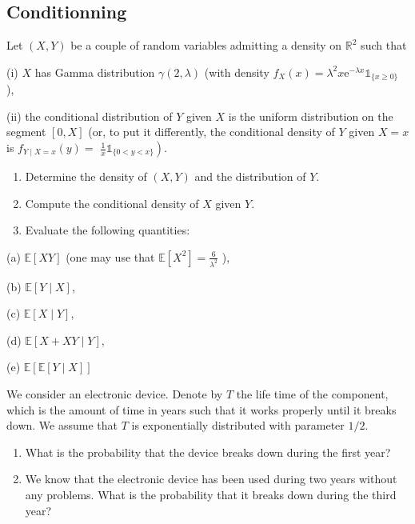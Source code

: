 \begin{center}
  \section*{Conditionning}
\end{center}

\begin{Exercise}
  Let $(X, Y)$ be a couple of random variables admitting a density on $\mathbb{R}^{2}$ such that

  (i) $X$ has Gamma distribution $\gamma(2, \lambda)$ (with density $f_{X}(x)=\lambda^{2} x \mathrm{e}^{-\lambda x} \mathbb{1}_{\{x \geq 0\}}$ ),

  (ii) the conditional distribution of $Y$ given $X$ is the uniform distribution on the segment $[0, X]$ (or, to put it differently, the conditional density of $Y$ given $X=x$ is $f_{Y \mid X=x}(y)=$ $\left.\frac{1}{x} \mathbb{1}_{\{0<y<x\}}\right)$.

  \begin{enumerate}
    \item Determine the density of $(X, Y)$ and the distribution of $Y$.

    \item Compute the conditional density of $X$ given $Y$.

    \item Evaluate the following quantities:

  \end{enumerate}

  (a) $\mathbb{E}[X Y]$ (one may use that $\mathbb{E}\left[X^{2}\right]=\frac{6}{\lambda^{2}}$ ),

  (b) $\mathbb{E}[Y \mid X]$,

  (c) $\mathbb{E}[X \mid Y]$,

  (d) $\mathbb{E}[X+X Y \mid Y]$,

  (e) $\mathbb{E}[\mathbb{E}[Y \mid X]]$
\end{Exercise}

\begin{Exercise}
  We consider an electronic device. Denote by $T$ the life time of the component, which is the amount of time in years such that it works properly until it breaks down. We assume that $T$ is exponentially distributed with parameter $1 / 2$.

  \begin{enumerate}
    \item What is the probability that the device breaks down during the first year?

    \item We know that the electronic device has been used during two years without any problems. What is the probability that it breaks down during the third year?

  \end{enumerate}
\end{Exercise}

